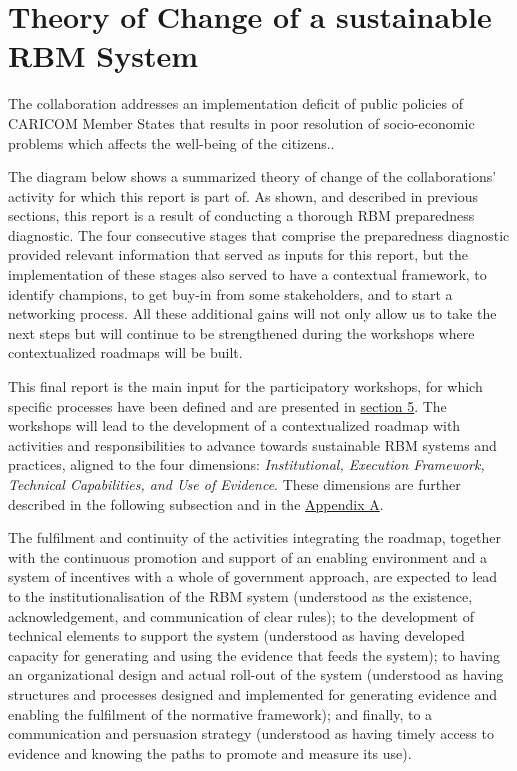 \documentclass[
  10pt,
]{book}
\begin{document}
\hypertarget{theory-of-change-of-a-sustainable-rbm-system}{%
\section{Theory of Change of a sustainable RBM System}\label{theory-of-change-of-a-sustainable-rbm-system}}

The collaboration addresses an implementation deficit of public policies of CARICOM Member States that results in poor resolution of socio-economic problems which affects the well-being of the citizens..

The diagram below shows a summarized theory of change of the collaborations' activity for which this report is part of. As shown, and described in previous sections, this report is a result of conducting a thorough RBM preparedness diagnostic. The four consecutive stages that comprise the preparedness diagnostic provided relevant information that served as inputs for this report, but the implementation of these stages also served to have a contextual framework, to identify champions, to get buy-in from some stakeholders, and to start a networking process. All these additional gains will not only allow us to take the next steps but will continue to be strengthened during the workshops where contextualized roadmaps will be built.

This final report is the main input for the participatory workshops, for which specific processes have been defined and are presented in \protect\hyperlink{section5}{section 5}. The workshops will lead to the development of a contextualized roadmap with activities and responsibilities to advance towards sustainable RBM systems and practices, aligned to the four dimensions: \emph{Institutional, Execution Framework, Technical Capabilities, and Use of Evidence}. These dimensions are further described in the following subsection and in the \protect\hyperlink{appendixA}{Appendix A}.

The fulfilment and continuity of the activities integrating the roadmap, together with the continuous promotion and support of an enabling environment and a system of incentives with a whole of government approach, are expected to lead to the institutionalisation of the RBM system (understood as the existence, acknowledgement, and communication of clear rules); to the development of technical elements to support the system (understood as having developed capacity for generating and using the evidence that feeds the system); to having an organizational design and actual roll-out of the system (understood as having structures and processes designed and implemented for generating evidence and enabling the fulfilment of the normative framework); and finally, to a communication and persuasion strategy (understood as having timely access to evidence and knowing the paths to promote and measure its use).
\end{document}
